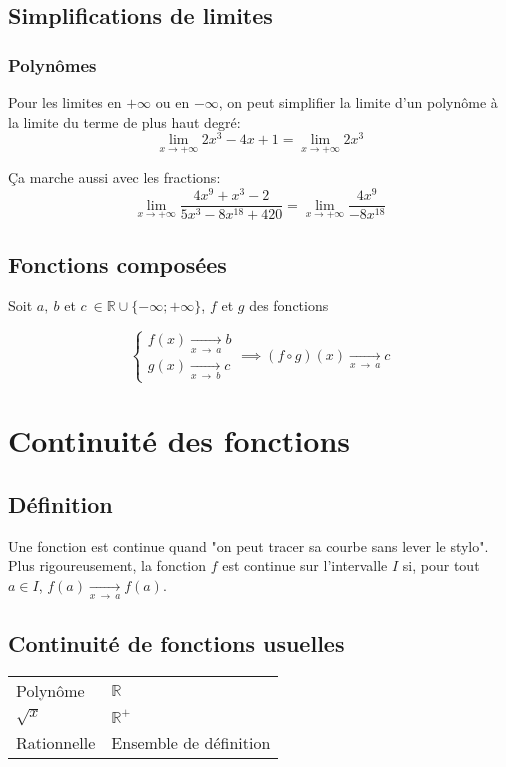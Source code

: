 \documentclass{article}
\newcommand{\R}{\mathds{R}}
\newcommand{\goesto}[2]{\xrightarrow[#1\:\to\:#2]{}}
\newcommand{\liminfty}{\lim_{x\to+\infty}}
\begin{document}
\subsection{Simplifications de limites}

\subsubsection{Polynômes}

Pour les limites en $+\infty$ ou en $-\infty$, on peut simplifier la limite d'un polynôme à la limite du terme de plus haut degré:
\[\liminfty 2x^3 - 4x + 1 = \liminfty 2x^3\]

Ça marche aussi avec les fractions:
\[\liminfty \frac{4x^9 + x^3 - 2}{5x^3 - 8x^{18} + 420} = \liminfty \frac{4x^9}{-8x^{18}}\]

\subsection{Fonctions composées}

Soit $a,\:b$ et $c\:\in \R \cup \{ -\infty; +\infty \}$, $f$ et $g$ des fonctions

$$\begin{cases}
f(x) \goesto{x}{a} b\\
g(x) \goesto{x}{b} c
\end{cases} \implies (f \circ g)(x) \goesto{x}{a} c$$

\newpage

\section{Continuité des fonctions}

\subsection{Définition}

Une fonction est continue quand "on peut tracer sa courbe sans lever le stylo". Plus rigoureusement, la fonction $f$ est continue sur l'intervalle $I$ si, pour tout $a \in I$, $f(a) \goesto{x}{a} f(a)$.

\subsection{Continuité de fonctions usuelles}

\begin{table}[H]
    \centering
    \begin{tabular}{ll}
         Polynôme & $\R$ \\
         $\sqrt{x}$ & $\R^+$ \\
         Rationnelle & Ensemble de définition \\
    \end{tabular}
\end{table}
\end{document}
